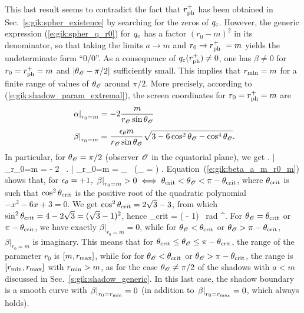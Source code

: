This last result seems to contradict the fact that
$r_{\rm ph}^+$ has been
obtained in Sec.~\ref{s:gik:spher_existence} by searching for the zeros of $q_{\rm c}$.
However, the generic expression (\ref{e:gik:spher_q_r0}) for $q_{\rm c}$ has a factor $(r_0 - m)^2$
in its denominator, so that taking the limits $a\to m$ and $r_0\to r_{\rm ph}^+\ =  m$
yields the undeterminate form ``0/0''. As a consequence of $q_{\rm c}(r_{\rm ph}^+) \neq 0$,
one has $\beta\neq 0$ for $r_0 = r_{\rm ph}^+ = m$ and $|\theta_{\mathscr{O}} - \pi/2|$ sufficiently small.
This implies that $r_{\rm min} = m$ for a finite range of values of $\theta_{\mathscr{O}}$ around
$\pi/2$.
More precisely,
according to (\ref{e:gik:shadow_param_extremal}), the screen coordinates for $r_0 = r_{\rm ph}^+ = m$ are
\begin{subequations}
\label{e:gik:shadow_extremal_term}
\begin{align}
& \left. \alpha \right| _{r_0=m} =  - 2 \frac{m}{r_{\mathscr{O}}\sin\theta_{\mathscr{O}}}  \\[1ex]
& \left. \beta \right| _{r_0=m} = \frac{\epsilon_\theta m}{r_{\mathscr{O}} \sin\theta_{\mathscr{O}}}
        \sqrt{ 3 - 6 \cos^2\theta_{\mathscr{O}} - \cos^4\theta_{\mathscr{O}}} .  \label{e:gik:beta_a_m_r0_m}
\end{align}
\end{subequations}
In particular, for $\theta_{\mathscr{O}}=\pi/2$ (observer $\mathscr{O}$ in the equatorial plane), we get
\be \label{e:gik:shadow_extremal_term_equat}
    \left. \alpha \right| _{r_0=m}  = - 2 \, 
    \qand
    \left. \beta \right| _{r_0=m} = \eps_\th {} \,  \qquad
    \left(\th_{\Obs} =  \right) .
\ee
Equation~(\ref{e:gik:beta_a_m_r0_m}) shows that, for $\epsilon_\theta = +1$,
$\left. \beta \right| _{r_0=m} > 0 \iff \theta_{\rm crit} < \theta_{\mathscr{O}} < \pi - \theta_{\rm crit}$,
where $\theta_{\rm crit}$ is such that $\cos^2\theta_{\rm crit}$ is
the positive root of the quadratic polynomial $-x^2 - 6 x + 3 = 0$. We get
$\cos^2\theta_{\rm crit} = 2\sqrt{3} - 3$, from which $\sin^2\theta_{\rm crit} = 4 - 2\sqrt{3} = (\sqrt{3} - 1)^2$, hence
\be \label{e:gik:shadow_a1_th_crit}
    \th_{\rm crit} = \arcsin( - 1) \, {\rm rad} ^\circ .
\ee
For $\theta_{\mathscr{O}} = \theta_{\rm crit}$ or $\pi - \theta_{\rm crit}$, we have exactly $\left. \beta \right| _{r_0=m} = 0$,
while for $\theta_{\mathscr{O}} < \theta_{\rm crit}$ or $\theta_{\mathscr{O}} > \pi -  \theta_{\rm crit}$,
$\left. \beta \right| _{r_0=m}$ is imaginary. This means that
for $\theta_{\rm crit} \leq \theta_{\mathscr{O}} \leq \pi - \theta_{\rm crit}$, the range of the parameter $r_0$ is
$[m, r_{\rm max}]$, while for
for $\theta_{\mathscr{O}} < \theta_{\rm crit}$ or $\theta_{\mathscr{O}} > \pi -  \theta_{\rm crit}$,
the range is $[r_{\rm min}, r_{\rm max}]$ with $r_{\rm min} > m$, as for the case $\theta_{\mathscr{O}} \neq \pi/2$ of the shadows with $a < m$ discussed in Sec.~\ref{s:gik:shadow_generic}. In this last case,
the shadow boundary is a smooth curve with $\left. \beta \right| _{r_0=r_{\rm min}} = 0$ (in addition
to $\left. \beta \right| _{r_0=r_{\rm max}} = 0$, which always holds).

